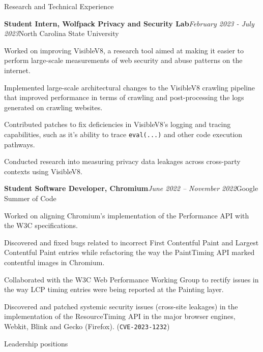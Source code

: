 \documentclass{resume} %
\begin{document}
\begin{rSection}{Research and Technical Experience}
\begin{rSubsection}{\bf Student Intern, Wolfpack Privacy and Security Lab}{\em February 2023 - July 2023}{North Carolina State University}{}
\item Worked on improving VisibleV8, a research tool aimed at making it easier to perform large-scale measurements of web security and abuse patterns on the internet.
\item Implemented large-scale architectural changes to the VisibleV8 crawling pipeline that improved performance in terms of crawling and post-processing the logs generated on crawling websites.
\item Contributed patches to fix deficiencies in VisibleV8's logging and tracing capabilities, such as it's ability to trace \texttt{eval(...)} and other code execution pathways.
\item Conducted research into measuring privacy data leakages across cross-party contexts using VisibleV8.
\end{rSubsection}
\begin{rSubsection}{\bf Student Software Developer, Chromium}{\em June 2022 -- November 2022}{Google Summer of Code}{}
\item Worked on aligning Chromium's implementation of the Performance API with the W3C specifications.
\item Discovered and fixed bugs related to incorrect First Contentful Paint and Largest Contentful Paint entries while refactoring the way the PaintTiming API marked contentful images in Chromium.
\item Collaborated with the W3C Web Performance Working Group to rectify issues in the way LCP timing entries were being reported at the Painting layer.
\item Discovered and patched systemic security issues (cross-site leakages) in the implementation of the ResourceTiming API in the major browser engines, Webkit, Blink and Gecko (Firefox). (\texttt{CVE-2023-1232})
\end{rSubsection}
\begin{rSection}{Leadership positions}

\end{rSection}
\end{rSection}
\end{document}
